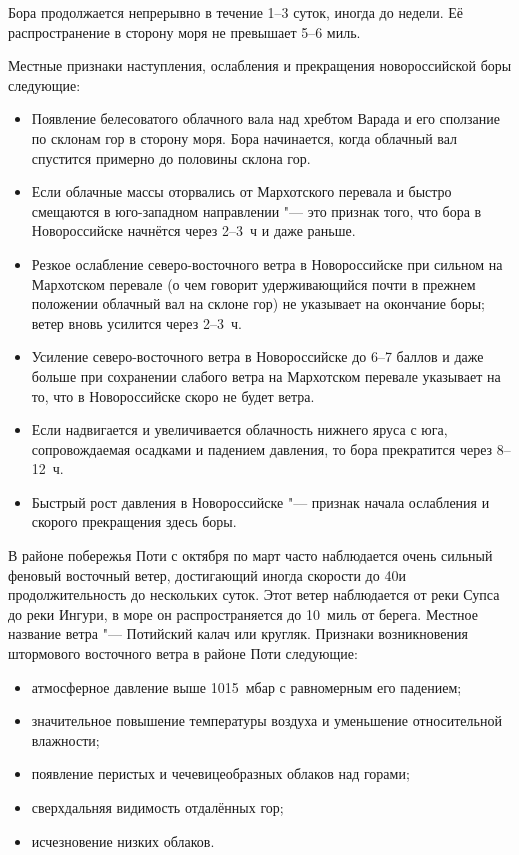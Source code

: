 Бора продолжается непрерывно в течение 1--3 суток, иногда до недели. Её
распространение в сторону моря не превышает 5--6 миль.

Местные признаки наступления, ослабления и прекращения новороссийской
боры следующие:
\begin{itemize}
\item Появление белесоватого облачного вала над хребтом Варада и его
  сползание по склонам гор в сторону моря. Бора начинается, когда
  облачный вал спустится примерно до половины склона гор.
\item Если облачные массы оторвались от Мархотского перевала и быстро
  смещаются в юго-западном направлении "--- это признак того, что бора в
  Новороссийске начнётся через 2--3~ч и даже раньше.
\item Резкое ослабление северо-восточного ветра в Новороссийске при
  сильном на Мархотском перевале (о чем говорит удерживающийся почти в
  прежнем положении облачный вал на склоне гор) не указывает на
  окончание боры; ветер вновь усилится через 2--3~ч.
\item Усиление северо-восточного ветра в Новороссийске до 6--7 баллов и
  даже больше при сохранении слабого ветра на Мархотском перевале
  указывает на то, что в Новороссийске скоро не будет ветра.
\item Если надвигается и увеличивается облачность нижнего яруса с юга,
  сопровождаемая осадками и падением давления, то бора прекратится
  через 8--12~ч.
\item Быстрый рост давления в Новороссийске "--- признак начала ослабления
  и скорого прекращения здесь боры.
\end{itemize}
  
В районе побережья Поти с октября по март часто наблюдается очень
сильный феновый восточный ветер, достигающий иногда скорости до
40\speedms и продолжительность до нескольких суток. Этот ветер
наблюдается от реки Супса до реки Ингури, в море он распространяется
до 10~миль от берега. Местное название ветра "--- Потийский калач или
кругляк. Признаки возникновения штормового восточного ветра в районе
Поти следующие:
\begin{itemize}
\item атмосферное давление выше 1015~мбар с равномерным его падением;
\item значительное повышение температуры воздуха и уменьшение
  относительной влажности;
\item появление перистых и чечевицеобразных облаков над горами;
\item сверхдальняя видимость отдалённых гор;
\item исчезновение низких облаков.
\end{itemize}

